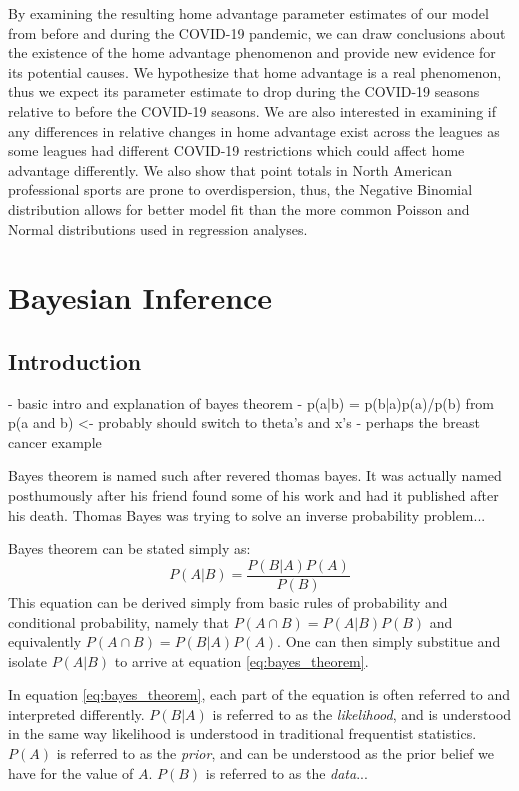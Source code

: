 By examining the resulting home advantage parameter estimates of our model from before and during the COVID-19 pandemic, we can draw conclusions about the existence of the home advantage phenomenon and provide new evidence for its potential causes. We hypothesize that home advantage is a real phenomenon, thus we expect its parameter estimate to drop during the COVID-19 seasons relative to before the COVID-19 seasons. We are also interested in examining if any differences in relative changes in home advantage exist across the leagues as some leagues had different COVID-19 restrictions which could affect home advantage differently. We also show that point totals in North American professional sports are prone to overdispersion, thus, the Negative Binomial distribution allows for better model fit than the more common Poisson and Normal distributions used in regression analyses.

\section{Bayesian Inference}

\subsection{Introduction}

- basic intro and explanation of bayes theorem
	- p(a|b) = p(b|a)p(a)/p(b) from p(a and b) <- probably should switch to theta's and x's
	- perhaps the breast cancer example
	
Bayes theorem is named such after revered thomas bayes. It was actually named posthumously after his friend found some of his work and had it published after his death. Thomas Bayes was trying to solve an inverse probability problem...

Bayes theorem can be stated simply as:
\begin{equation} \label{eq:bayes_theorem}
P(A|B) = \frac{P(B|A)P(A)}{P(B)}
\end{equation}
This equation can be derived simply from basic rules of probability and conditional probability, namely that $P(A\cap B) = P(A|B)P(B)$ and equivalently $P(A \cap B) = P(B|A)P(A)$. One can then simply substitue and isolate $P(A|B)$ to arrive at equation \ref{eq:bayes_theorem}.

In equation \ref{eq:bayes_theorem}, each part of the equation is often referred to and interpreted differently. $P(B|A)$ is referred to as the \textit{likelihood}, and is understood in the same way likelihood is understood in traditional frequentist statistics. $P(A)$ is referred to as the \textit{prior}, and can be understood as the prior belief we have for the value of $A$. $P(B)$ is referred to as the \textit{data}...

